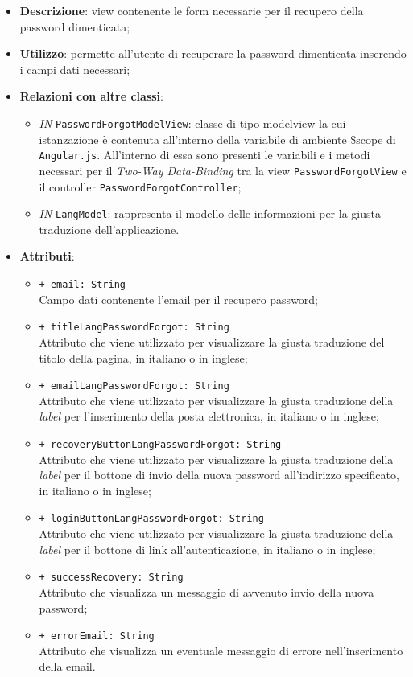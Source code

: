 \begin{itemize}
	\item \textbf{Descrizione}: view contenente le form necessarie per il recupero della password dimenticata;
	\item \textbf{Utilizzo}: permette all'utente di recuperare la password dimenticata inserendo i campi dati necessari;
	\item \textbf{Relazioni con altre classi}:
	\begin{itemize}
			\item \textit{IN} \texttt{PasswordForgotModelView}: classe di tipo modelview la cui istanzazione è contenuta all'interno della variabile di ambiente \$scope di \texttt{Angular.js}. All'interno di essa sono presenti le variabili e i metodi necessari per il \textit{Two-Way Data-Binding} tra la view \texttt{PasswordForgotView} e il controller \texttt{PasswordForgotController};
			\item \textit{IN} \texttt{LangModel}: rappresenta il modello delle informazioni per la giusta traduzione dell'applicazione.
	\end{itemize}
	\item \textbf{Attributi}:
	\begin{itemize}
		\item \texttt{+ email: String} \\ Campo dati contenente l'email per il recupero password;
		\item \texttt{+ titleLangPasswordForgot: String} \\ Attributo che viene utilizzato per visualizzare la giusta traduzione del titolo della pagina, in italiano o in inglese;
		\item \texttt{+ emailLangPasswordForgot: String} \\ Attributo che viene utilizzato per visualizzare la giusta traduzione della \textit{label} per l'inserimento della posta elettronica, in italiano o in inglese;
		\item \texttt{+ recoveryButtonLangPasswordForgot: String} \\ Attributo che viene utilizzato per visualizzare la giusta traduzione della \textit{label} per il bottone di invio della nuova password all'indirizzo specificato, in italiano o in inglese;
		\item \texttt{+ loginButtonLangPasswordForgot: String} \\ Attributo che viene utilizzato per visualizzare la giusta traduzione della \textit{label} per il bottone di link all'autenticazione, in italiano o in inglese;
		\item \texttt{+ successRecovery: String} \\ Attributo che visualizza un messaggio di avvenuto invio della nuova password;
		\item \texttt{+ errorEmail: String} \\ Attributo che visualizza un eventuale messaggio di errore nell'inserimento della email.
	\end{itemize}
\end{itemize}